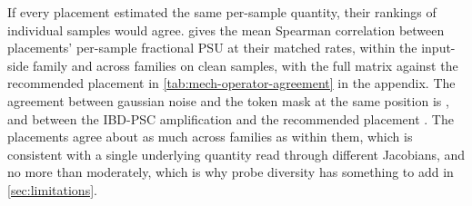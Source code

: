 \documentclass[../main.tex]{subfiles}
\begin{document}
If every placement estimated the same per-sample quantity, their rankings of individual samples would agree.  gives the mean Spearman correlation between placements' per-sample fractional PSU at their matched rates, \AgreementWithinInputSideClean{} within the input-side family and \AgreementAcrossFamiliesClean{} across families on clean samples, with the full matrix against the recommended placement in \cref{tab:mech-operator-agreement} in the appendix. The agreement between gaussian noise and the token mask at the same position is \AgreementGaussianVsTokenMaskClean{}, and between the IBD-PSC amplification and the recommended placement \AgreementGainScaleVsRecommendedClean{}. The placements agree about as much across families as within them, which is consistent with a single underlying quantity read through different Jacobians, and no more than moderately, which is why probe diversity has something to add in \cref{sec:limitations}.


\end{document}
